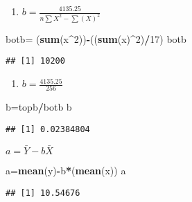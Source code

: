 \documentclass[]{article}
\newenvironment{Shaded}{\begin{snugshade}}{\end{snugshade}}
\newcommand{\KeywordTok}[1]{\textcolor[rgb]{0.13,0.29,0.53}{\textbf{#1}}}
\newcommand{\DecValTok}[1]{\textcolor[rgb]{0.00,0.00,0.81}{#1}}
\newcommand{\StringTok}[1]{\textcolor[rgb]{0.31,0.60,0.02}{#1}}
\newcommand{\OperatorTok}[1]{\textcolor[rgb]{0.81,0.36,0.00}{\textbf{#1}}}
\newcommand{\NormalTok}[1]{#1}
\providecommand{\tightlist}{%
  \setlength{\itemsep}{0pt}\setlength{\parskip}{0pt}}
\begin{document}
\begin{enumerate}
\def\labelenumi{\arabic{enumi}.}
\setcounter{enumi}{1}
\tightlist
\item
  \(b = \frac{4135.25}{n\sum X^2-\sum (X)^2}\)
\end{enumerate}

\begin{Shaded}
\begin{Highlighting}[]
\NormalTok{botb=}\StringTok{ }\NormalTok{(}\KeywordTok{sum}\NormalTok{(x}\OperatorTok{^}\DecValTok{2}\NormalTok{))}\OperatorTok{-}\NormalTok{((}\KeywordTok{sum}\NormalTok{(x)}\OperatorTok{^}\DecValTok{2}\NormalTok{)}\OperatorTok{/}\DecValTok{17}\NormalTok{)}
\NormalTok{botb}
\end{Highlighting}
\end{Shaded}

\begin{verbatim}
## [1] 10200
\end{verbatim}

\begin{enumerate}
\def\labelenumi{\arabic{enumi}.}
\setcounter{enumi}{2}
\tightlist
\item
  \(b = \frac{4135.25 }{256}\)
\end{enumerate}

\begin{Shaded}
\begin{Highlighting}[]
\NormalTok{b=topb}\OperatorTok{/}\NormalTok{botb}
\NormalTok{b}
\end{Highlighting}
\end{Shaded}

\begin{verbatim}
## [1] 0.02384804
\end{verbatim}

\(a = \mathrel{\bar{Y}}-b\mathrel{\bar{X}}\)

\begin{Shaded}
\begin{Highlighting}[]
\NormalTok{a=}\KeywordTok{mean}\NormalTok{(y)}\OperatorTok{-}\NormalTok{b}\OperatorTok{*}\NormalTok{(}\KeywordTok{mean}\NormalTok{(x))}
\NormalTok{a}
\end{Highlighting}
\end{Shaded}

\begin{verbatim}
## [1] 10.54676
\end{verbatim}
\end{document}
